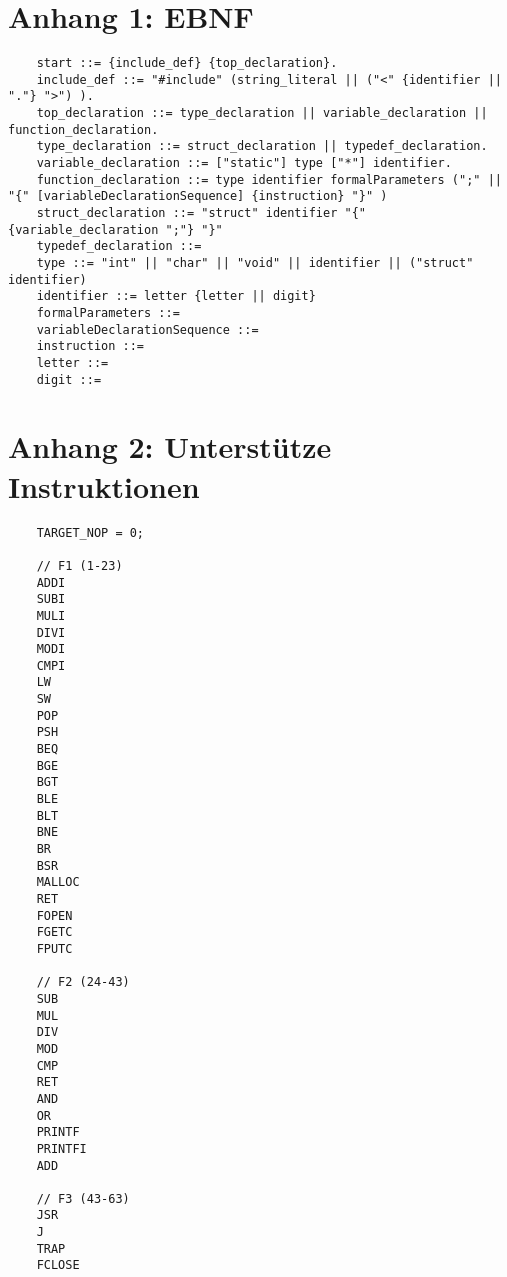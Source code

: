 \documentclass{article}
\begin{document}
	\section{Anhang 1: EBNF}
	\begin{lstlisting}
	start ::= {include_def} {top_declaration}.
	include_def ::= "#include" (string_literal || ("<" {identifier || "."} ">") ).
	top_declaration ::= type_declaration || variable_declaration || function_declaration.
	type_declaration ::= struct_declaration || typedef_declaration.
	variable_declaration ::= ["static"] type ["*"] identifier.
	function_declaration ::= type identifier formalParameters (";" || "{" [variableDeclarationSequence] {instruction} "}" )
	struct_declaration ::= "struct" identifier "{" {variable_declaration ";"} "}"
	typedef_declaration ::=
	type ::= "int" || "char" || "void" || identifier || ("struct" identifier)
	identifier ::= letter {letter || digit}
	formalParameters ::=
	variableDeclarationSequence ::=
	instruction ::=
	letter ::=
	digit ::=

	\end{lstlisting}

	\newpage
	\section{Anhang 2: Unterstütze Instruktionen}
	\begin{lstlisting}
	TARGET_NOP = 0;

	// F1 (1-23)
	ADDI
	SUBI
	MULI
	DIVI
	MODI
	CMPI
	LW
	SW
	POP
	PSH
	BEQ
	BGE
	BGT
	BLE
	BLT
	BNE
	BR
	BSR
	MALLOC
	RET
	FOPEN
	FGETC
	FPUTC

	// F2 (24-43)
	SUB
	MUL
	DIV
	MOD
	CMP
	RET
	AND
	OR
	PRINTF
	PRINTFI
	ADD

	// F3 (43-63)
	JSR
	J
	TRAP
	FCLOSE
	\end{lstlisting}
\end{document}
